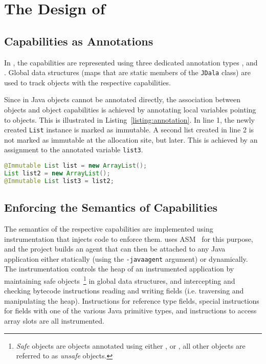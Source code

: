 \section{The Design of \jdala}
\label{sec:design}	


\subsection{Capabilities as Annotations}
\label{subsection:capabilitesAsAnnotations}

In \jdala, the \dala capabilities are represented using three dedicated annotation types \Immutable, \Isolated and \Local.  Global data structures (maps that are static members of the \texttt{JDala} class) are used to track objects with the respective capabilities.   

Since in Java  objects cannot be annotated directly, the association between objects and object capabilities is achieved by annotating local variables pointing to objects.  This is illustrated in Listing~\ref{listing:annotation}.  In line 1, the newly created \texttt{List} instance is marked as immutable.  A second list created in line 2 is not marked as immutable at the allocation site, but later. This is achieved by an assignment to the annotated variable \texttt{list3}. 


\begin{lstlisting}[language=Java, caption=Associating objects with capabilities, label=listing:annotation]
@Immutable List list = new ArrayList();
List list2 = new ArrayList();
@Immutable List list3 = list2;
\end{lstlisting}


\subsection{Enforcing the Semantics of Capabilities}

The semantics of the respective capabilities are implemented using instrumentation that injects code to enforce them. 
\jdala uses ASM~\cite{bruneton2002asm} for this purpose, and the project builds an agent that can then be attached to any Java application either statically (using the \texttt{-javaagent} argument) or dynamically.
The instrumentation controls the heap of an instrumented application by maintaining safe objects~\footnote{\textit{Safe} objects are objects annotated using either \Immutable, \Isolated or \Local, all other objects are referred to as \textit{unsafe} objects.} in global data structures, and intercepting and checking bytecode instructions reading and writing fields (i.e. traversing and manipulating the heap).  Instructions for reference type fields, special instructions for fields with one of the various Java primitive types, and instructions to access array slots are all instrumented. 


